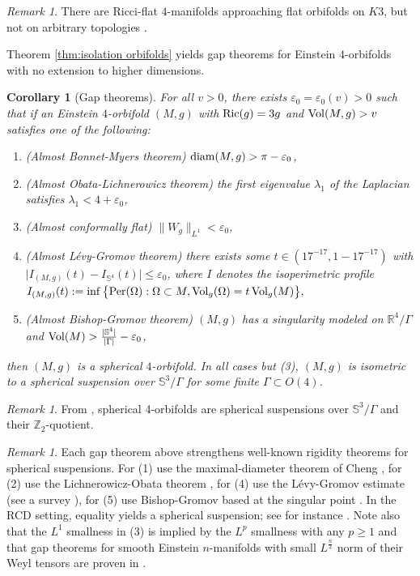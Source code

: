 \documentclass[11pt,reqno]{amsart}
\numberwithin{equation}{section}
\newcommand{\Ric}{{\rm Ric}}
\newcommand{\Vol}{{\rm Vol}}
\newcommand{\diam}{{\rm diam}}
\newtheorem{corollary}[thm]{Corollary}
\theoremstyle{definition}
\theoremstyle{remark}
\newtheorem{remark}[thm]{Remark}
\begin{document}
\begin{remark}
    There are Ricci-flat $4$-manifolds approaching flat orbifolds \cite{LS} on $K3$, but not on arbitrary topologies \cite{bk,ozu3}.
\end{remark}


Theorem \ref{thm:isolation orbifolds} yields gap theorems for Einstein $4$-orbifolds with no extension to higher dimensions.


\begin{corollary}[Gap theorems]\label{cor:gap thms}
For all $v>0$, there exists $\varepsilon_0=\varepsilon_0(v)>0$ such that if an Einstein $4$-orbifold $(M,g)$ with $\Ric(g)=3g$ and $\Vol(M,g)>v$ satisfies one of the following:
\begin{enumerate}
  \item \emph{(Almost Bonnet-Myers theorem)} $\diam(M,g)>\pi-\varepsilon_0$,
  \item \emph{(Almost Obata-Lichnerowicz theorem)} the first eigenvalue $\lambda_1$ of the Laplacian satisfies $\lambda_1<4+\varepsilon_0$,
  \item \emph{(Almost conformally flat)} $\|W_g\|_{L^1}<\varepsilon_0$,
  \item \emph{(Almost Lévy-Gromov theorem)} there exists some $t\in(17^{-17},1-17^{-17})$ with $\big|I_{(M,g)}(t)-I_{\mathbb S^4}(t)\big|\leqslant \varepsilon_0$, where $I$ denotes the isoperimetric profile $I_{(M,g)}(t):=\inf\big\{\mathrm{Per}(\Omega): \Omega\subset M, \Vol_g(\Omega)=t\,\Vol_g(M)\big\},$
  \item \emph{(Almost Bishop-Gromov theorem)} $(M,g)$ has a singularity modeled on $\mathbb{R}^4/\Gamma$ and $\Vol(M)>\frac{|\mathbb S^4|}{|\Gamma|}-\varepsilon_0$,
\end{enumerate}
then $(M,g)$ is a spherical $4$-orbifold. In all cases but (3), $(M,g)$ is isometric to a spherical suspension over $\mathbb S^3/\Gamma$ for some finite $\Gamma\subset O(4)$.
\end{corollary}
\begin{remark}
    From \cite{ctz}, spherical 4-orbifolds are spherical suspensions over $\mathbb S^3/\Gamma$ and their $\mathbb{Z}_2$-quotient. 
\end{remark}



\begin{remark}
Each gap theorem above strengthens well-known rigidity theorems for spherical suspensions. For (1) use the maximal-diameter theorem of Cheng \cite{che75}, for (2) use the Lichnerowicz-Obata theorem \cite{lic58,oba62}, for (4) use the Lévy-Gromov estimate \cite{gro} (see a survey \cite{ant25}), for (5) use Bishop-Gromov based at the singular point \cite{bc64,gro}. In the RCD setting, equality yields a spherical suspension; see for instance \cite{ket15,cam17}. Note also that the $L^1$ smallness in (3) is implied by the $L^p$ smallness with any $p\geqslant 1$ and that gap theorems for smooth Einstein $n$-manifolds with small $L^{\frac{n}{2}}$ norm of their Weyl tensors are proven in \cite{Sin92,She90,IS02}.
\end{remark}
\end{document}
